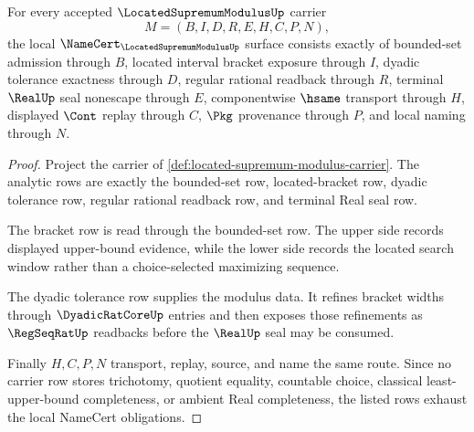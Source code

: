 \begin{theorem}
\label{thm:located-supremum-modulus-namecert}
For every accepted $\LocatedSupremumModulusUp$ carrier
$$
M=(B,I,D,R,E,H,C,P,N),
$$
the local $\NameCert_{\LocatedSupremumModulusUp}$ surface consists exactly of bounded-set admission through $B$, located interval bracket exposure through $I$, dyadic tolerance exactness through $D$, regular rational readback through $R$, terminal $\RealUp$ seal nonescape through $E$, componentwise $\hsame$ transport through $H$, displayed $\Cont$ replay through $C$, $\Pkg$ provenance through $P$, and local naming through $N$.
\end{theorem}
\begin{proof}
Project the carrier of \autoref{def:located-supremum-modulus-carrier}. The analytic rows are exactly the bounded-set row, located-bracket row, dyadic tolerance row, regular rational readback row, and terminal Real seal row.

The bracket row is read through the bounded-set row. The upper side records displayed upper-bound evidence, while the lower side records the located search window rather than a choice-selected maximizing sequence.

The dyadic tolerance row supplies the modulus data. It refines bracket widths through $\DyadicRatCoreUp$ entries and then exposes those refinements as $\RegSeqRatUp$ readbacks before the $\RealUp$ seal may be consumed.

Finally $H,C,P,N$ transport, replay, source, and name the same route. Since no carrier row stores trichotomy, quotient equality, countable choice, classical least-upper-bound completeness, or ambient Real completeness, the listed rows exhaust the local NameCert obligations.
\end{proof}




